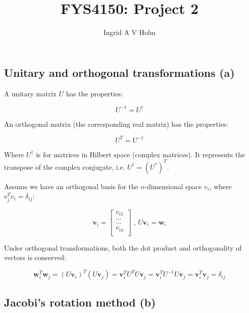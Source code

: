 \documentclass[11pt]{article}
\begin{document}
\title{FYS4150: Project 2}
\author{Ingrid A V Holm}
\maketitle

\subsection*{Unitary and orthogonal transformations (a)}

\begin{flushleft}
A unitary matrix $U$ has the properties: 

\begin{equation}
U^{-1} = U^{\dagger}
\end{equation}

An orthogonal matrix (the corresponding real matrix) has the properties:

\begin{equation}
U^T = U^{-1}
\end{equation}

Where $U^{\dagger}$ is for matrices in Hilbert space (complex matrices). It represents the transpose of the complex conjugate, i.e. $U^{\dagger} = (U^*)^T$.
\end{flushleft}

\begin{flushleft}
Assume we have an orthogonal basis for the $n$-dimensional space $v_i$, where $v_j^T v_i = \delta_{ij}$:

\begin{equation*}
\textbf{v}_i = \begin{bmatrix}
v_{i1}\\
...\\
...\\
v_{in}\\
\end{bmatrix}
\text{ , }
U \textbf{v}_i = \textbf{w}_i
\end{equation*} 

Under orthogonal transformations, both the dot product and orthogonality of vectors is conserved:

$$
\textbf{w}_i^T \textbf{w}_j = (U \textbf{v}_i)^T (U \textbf{v}_j) = \textbf{v}_i^T U^T U \textbf{v}_j = \textbf{v}_i^T U^{-1} U \textbf{v}_j = \textbf{v}_i^T \textbf{v}_j = \delta_{ij}
$$
\end{flushleft}

\subsection*{Jacobi's rotation method (b)}
\end{document}
